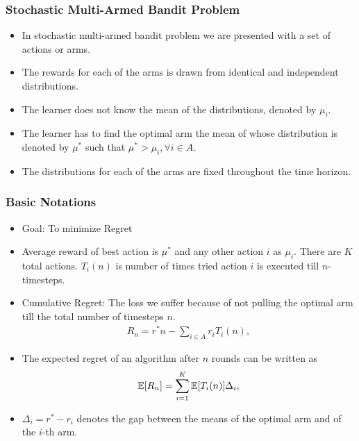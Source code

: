 \begin{frame}
\frametitle{Stochastic Multi-Armed Bandit Problem}
\begin{itemize}
\item<1-> In stochastic multi-armed bandit problem we are presented with a set of actions or arms. 
\item<2-> The rewards for each of the arms is drawn from identical and independent distributions. 
\item<3-> The learner does not know the mean of the distributions, denoted by $\mu_{i}$. 
\item<4-> The learner has to find the optimal arm the mean of whose distribution is denoted by $\mu^{*}$ such that $\mu^{*}> \mu_{i}, \forall i\in A$.
\item<5-> The distributions for each of the arms are fixed throughout the time horizon. 
\end{itemize}
\end{frame}

\begin{frame}
\frametitle{Basic Notations}
\begin{itemize}
\item<1-> Goal: To minimize Regret
\item<2->  Average reward of best action is $\mu^{*}$ and any other action $i$ as $\mu_{i}$. There are $K$ total actions. $T_{i}(n)$ is number of times tried action $i$ is executed till $n$-timesteps.
\item<3->  Cumulative Regret: The loss we suffer because of not pulling the optimal arm till the total number of timesteps  $n$. 
\begin{align*}
R_{n}=r^{*}n - \sum_{i\in A} r_{i}T_{i}(n),
\end{align*}
\item<4->  The expected regret of an algorithm after $n$ rounds can be written as
\begin{align*}
\mathbb{E}[R_{n}]= \sum_{i=1}^K \mathbb{E}[T_{i}(n)] \Delta_i,
\end{align*}
\item<5-> $\Delta_{i}=r^{*}-r_{i}$ denotes the gap between the means of the optimal arm and of the $i$-th arm. 
\end{itemize}
\end{frame}